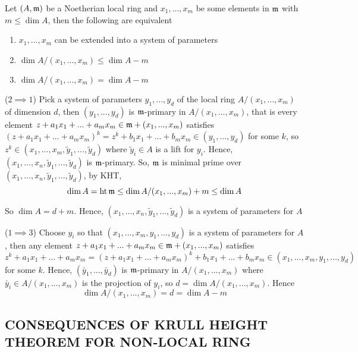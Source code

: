 \begin{proposition}
	Let $(A, \mathfrak{m})$ be a Noetherian local ring and $x_1, ..., x_m$ be some elements in $\mathfrak{m}$ with $m \leq \dim A$, then the following are equivalent
	\begin{enumerate}
		\item $x_1, ..., x_m$ can be extended into a system of parameters
		\item $\dim A / (x_1, ..., x_m) \leq \dim A - m$
		\item $\dim A / (x_1, ..., x_m) = \dim A - m$
	\end{enumerate}
\end{proposition}

\begin{longproof}
	($2 \implies 1$) Pick a system of parameters $y_1, ..., y_d$ of the local ring $A / (x_1, ..., x_m)$ of dimension $d$, then $(y_1, ..., y_d)$ is $\mathfrak{m}$-primary in $A / (x_1, ..., x_m)$, that is every element $z + a_1 x_1 + ... + a_m x_m \in \mathfrak{m} + (x_1, ..., x_m)$ satisfies $(z + a_1 x_1 + ... + a_m x_m)^k = z^k + b_1 x_1 + ... + b_m x_m \in (y_1, ..., y_d)$ for some $k$, so $z^k \in (x_1, ..., x_m, \tilde{y}_1, ..., \tilde{y}_d)$ where $\tilde{y}_i \in A$ is a lift for $y_i$. Hence, $(x_1, ..., x_n, \tilde{y}_1, ..., \tilde{y}_d)$ is $\mathfrak{m}$-primary. So, $\mathfrak{m}$ is minimal prime over $(x_1, ..., x_n, \tilde{y}_1, ..., \tilde{y}_d)$, by KHT,
	$$
		\dim A = \operatorname{ht}{\mathfrak{m}} \leq \dim A / (x_1, ..., x_m) + m \leq \dim A
	$$
	
	So $\dim A = d + m$. Hence, $(x_1, ..., x_n, \tilde{y}_1, ..., \tilde{y}_d)$ is a system of parameters for $A$
	
	($1 \implies 3$) Choose $y_i$ so that $(x_1, ..., x_m, y_1, ..., y_d)$ is a system of parameters for $A$, then any element $z + a_1 x_1 + ... + a_m x_m \in \mathfrak{m} + (x_1, ..., x_m)$ satisfies $z^k + a_1 x_1 + ... + a_m x_m = (z + a_1 x_1 + ... + a_m x_m)^k + b_1 x_1 + ... + b_m x_m \in (x_1, ..., x_m, y_1, ..., y_d)$ for some $k$. Hence, $(\bar{y}_1, ..., \bar{y}_d)$ is $\mathfrak{m}$-primary in $A / (x_1, ..., x_m)$ where $\bar{y}_i \in A / (x_1, ..., x_m)$ is the projection of $y_i$, so $d = \dim A / (x_1, ..., x_m)$. Hence
	$$
		\dim A / (x_1, ..., x_m) = d = \dim A - m
	$$

\end{longproof}

\subsection{CONSEQUENCES OF KRULL HEIGHT THEOREM FOR NON-LOCAL RING}

